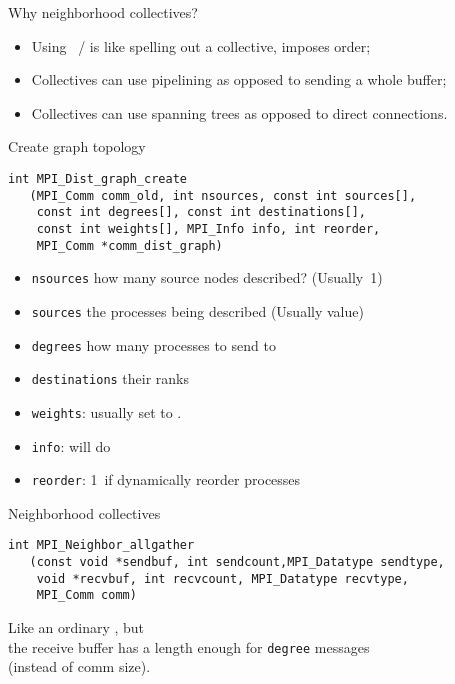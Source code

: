 \begin{numberedframe}{Why neighborhood collectives?}
  \begin{itemize}
  \item Using ~/  is like spelling out a collective,
    imposes order;
  \item Collectives can use pipelining as opposed to sending  a whole
    buffer;
  \item Collectives can use spanning trees as opposed to direct connections.
  \end{itemize}
\end{numberedframe}

\begin{numberedframe}{Create graph topology}
\lstset{language=C}
\begin{lstlisting}
int MPI_Dist_graph_create
   (MPI_Comm comm_old, int nsources, const int sources[],
    const int degrees[], const int destinations[], 
    const int weights[], MPI_Info info, int reorder,
    MPI_Comm *comm_dist_graph)
\end{lstlisting}
\begin{itemize}
\item \lstinline{nsources} how many source nodes described? (Usually~1)
\item \lstinline{sources} the processes being described (Usually
   value)
\item \lstinline{degrees} how many processes to send to
\item \lstinline{destinations} their ranks
\item \lstinline{weights}: usually set to .
\item \lstinline{info}:  will do
\item \lstinline{reorder}: 1~if dynamically reorder processes
\end{itemize}
\end{numberedframe}

\begin{numberedframe}{Neighborhood collectives}
\begin{lstlisting}
int MPI_Neighbor_allgather
   (const void *sendbuf, int sendcount,MPI_Datatype sendtype,
    void *recvbuf, int recvcount, MPI_Datatype recvtype,
    MPI_Comm comm)
\end{lstlisting}
Like an ordinary , but\\
the receive buffer has a length enough for \lstinline{degree} messages\\
(instead of comm size).
\end{numberedframe}

